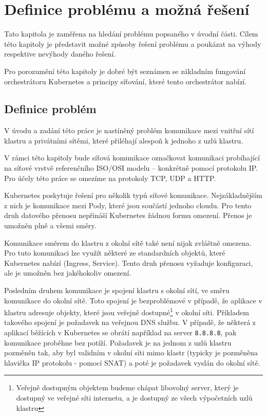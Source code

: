 \chapter{Definice problému a možná řešení}

\begin{chapterabstract}
Tato kapitola je zaměřena na hledání problému popsaného v úvodní části. Cílem této kapitoly je představit možné způsoby řešení problému a poukázat na výhody respektive nevýhody daného řešení.

Pro porozumění této kapitoly je dobré být seznámen se základním fungování orchestrátoru Kubernetes a principy síťování, které tento orchestrátor nabízí.  
\end{chapterabstract}


\section{Definice problém}
V úvodu a zadání této práce je nastíněný problém komunikace mezi vnitřní sítí klastru a privátními sítěmi, které přiléhají alespoň k jednoho z uzlů klastru. 

V rámci této kapitoly bude síťová komunikace označkovat komunikaci probíhající na síťové vrstvě referenčního ISO/OSI modelu -- konkrétně pomocí protokolu IP. Pro účely této práce se omezíme na protokoly TCP, UDP a HTTP.

Kubernetes poskytuje řešení pro několik typů síťové komunikace. Nejzákladnějším z nich je komunikace mezi Pody, které jsou součástí jednoho cloudu. Pro tento druh datového přenosu nepřináší Kubernetes žádnou formu omezení. Přenos je umožněn plně a všemi směry. 

Komunikace směrem do klastru z okolní sítě také není nijak zvláštně omezena. Pro tuto komunikaci lze využít některé ze standardních objektů, které Kubernetes nabízí (Ingress, Service). Tento druh přenosu vyžaduje konfiguraci, ale je umožněn bez jakéhokoliv omezení.

Posledním druhem komunikace je spojení klastru s okolní sítí, ve směru komunikace do okolní sítě. Toto spojení je bezproblémové v případě, že aplikace v klastru adresuje objekty, které jsou veřejně dostupné\footnote{Veřejně dostupným objektem budeme chápat libovolný server, který je dostupný ve veřejné síti internetu, a je dostupný ze všech výpočetních uzlů klastru} v okolní síti. Příkladem takového spojení je požadavek na veřejnou DNS službu. V případě, že některá z aplikací běžících v Kubernetes se obrátí například na server \verb|8.8.8.8|, pak komunikace proběhne bez potíží. Požadavek je na jednom z uzlů klastru pozměněn tak, aby byl validním v okolní síti mimo klastr (typicky je pozměněna hlavička IP protokolu - pomocí SNAT) a poté je požadavek vyslán do okolní sítě.

